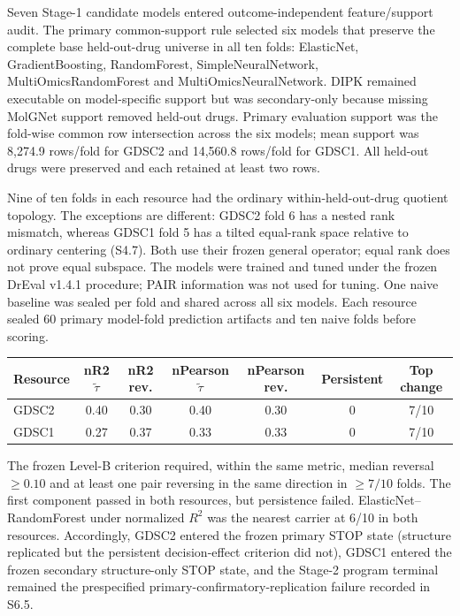 \documentclass[11pt]{article}
\begin{document}
Seven Stage-1 candidate models entered outcome-independent feature/support audit. The primary common-support rule selected six models that preserve the complete base held-out-drug universe in all ten folds: ElasticNet, GradientBoosting, RandomForest, SimpleNeuralNetwork, MultiOmicsRandomForest and MultiOmicsNeuralNetwork. DIPK remained executable on model-specific support but was secondary-only because missing MolGNet support removed held-out drugs. Primary evaluation support was the fold-wise common row intersection across the six models; mean support was 8,274.9 rows/fold for GDSC2 and 14,560.8 rows/fold for GDSC1. All held-out drugs were preserved and each retained at least two rows.

Nine of ten folds in each resource had the ordinary within-held-out-drug quotient topology. The exceptions are different: GDSC2 fold 6 has a nested rank mismatch, whereas GDSC1 fold 5 has a tilted equal-rank space relative to ordinary centering (S4.7). Both use their frozen general operator; equal rank does not prove equal subspace. The models were trained and tuned under the frozen DrEval v1.4.1 procedure; PAIR information was not used for tuning. One naive baseline was sealed per fold and shared across all six models. Each resource sealed 60 primary model-fold prediction artifacts and ten naive folds before scoring.

\begin{center}
\small
\begin{tabular}{@{}lcccccc@{}}
\toprule
Resource & nR2 $\tilde\tau$ & nR2 rev. & nPearson $\tilde\tau$ & nPearson rev. & Persistent & Top change \\
\midrule
GDSC2 & 0.40 & 0.30 & 0.40 & 0.30 & 0 & 7/10 \\
GDSC1 & 0.27 & 0.37 & 0.33 & 0.33 & 0 & 7/10 \\
\bottomrule
\end{tabular}
\end{center}
The frozen Level-B criterion required, within the same metric, median reversal $\ge0.10$ and at least one pair reversing in the same direction in $\ge7/10$ folds. The first component passed in both resources, but persistence failed. ElasticNet--RandomForest under normalized $R^2$ was the nearest carrier at 6/10 in both resources. Accordingly, GDSC2 entered the frozen primary STOP state (structure replicated but the persistent decision-effect criterion did not), GDSC1 entered the frozen secondary structure-only STOP state, and the Stage-2 program terminal remained the prespecified primary-confirmatory-replication failure recorded in S6.5.
\end{document}
